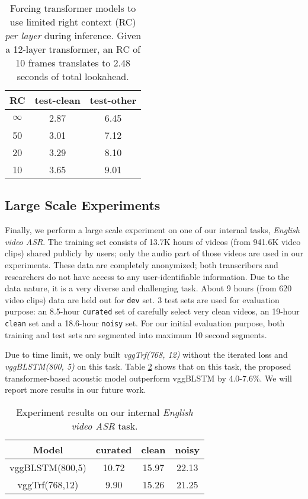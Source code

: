 \documentclass{article}
\begin{document}
\begin{table}[tb]
    \centering
    \caption{Forcing transformer models to use limited right context (RC) \emph{per layer} during inference. Given a 12-layer transformer, an RC of 10 frames translates to 2.48 seconds of total lookahead.}
    \begin{tabular}{|c||cc|}
    \hline
    RC & test-clean & test-other \\ 
    \hline
    $\infty$ & 2.87 & 6.45 \\
    50       & 3.01 & 7.12 \\
    20       & 3.29 & 8.10 \\
    10       & 3.65 & 9.01 \\
    \hline
    \end{tabular}
    \label{tab:rc}
\end{table}
\vspace{-0.5em}

\subsection{Large Scale Experiments}
\vspace{-0.5em}
Finally, we perform a large scale experiment on one of our internal tasks, \emph{English video ASR}. The training set consists of 13.7K hours of videos (from 941.6K video clips) shared publicly by users; only the audio part of those videos are used in our experiments. These data are completely anonymized; both transcribers and researchers do not have access to any user-identifiable information. Due to the data nature, it is a very diverse and challenging task.  About 9 hours (from 620 video clips) data are held out for \texttt{dev} set. 3 test sets are used for evaluation purpose: an 8.5-hour \texttt{curated} set of carefully select very clean videos, an 19-hour \texttt{clean} set and a 18.6-hour \texttt{noisy} set. For our initial evaluation purpose, both training and test sets are segmented into maximum 10 second segments. 

Due to time limit, we only built \textit{vggTrf(768, 12)} without the iterated loss and \textit{vggBLSTM(800, 5)} on this task. Table \ref{tab:video_asr} shows that on this task, the proposed transformer-based acoustic model outperform vggBLSTM by 4.0-7.6\%. We will report more results in our future work.  
\vspace{-1em}

\begin{table}[htb]
    \centering
    \caption{Experiment results on our internal \emph{English video ASR} task.}
    \begin{tabular}{|c|ccc|}
    \hline
    Model     & curated & clean & noisy  \\
    \hline\hline
    vggBLSTM(800,5) & 10.72 & 15.97 & 22.13 \\
    vggTrf(768,12) &  9.90 &  15.26 & 21.25 \\
    \hline
    \end{tabular}
    \label{tab:video_asr}
\end{table}
\vspace{-1em}
\end{document}
